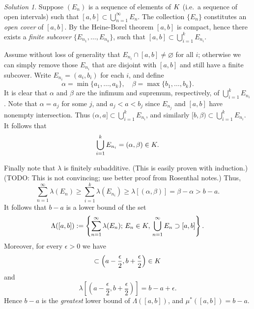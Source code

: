 \documentclass{report}
\let\sc\relax
\newcommand{\sc}[1]{\mathscr{#1}}
\theoremstyle{remark}
\newtheorem*{solution}{Solution}
\begin{document}
\begin{solution}
  Suppose $(E_n)$ is a sequence of elements of $\sc K$ (i.e.\ a sequence of open intervals) such that $[a,b] \subset \bigcup_{n=1}^\infty E_n$. The collection $\{E_n\}$ constitutes an \emph{open cover} of $[a,b]$. By the Heine-Borel theorem $[a,b]$ is compact, hence there exists a \emph{finite subcover} $\{E_{n_1}, \dots, E_{n_k}\}$, such that $[a,b] \subset \bigcup_{i=1}^k E_{n_i}$.

  Assume without loss of generality that $E_{n_i} \cap [a,b] \ne \varnothing$ for all $i$; otherwise we can simply remove those $E_{n_i}$ that are disjoint with $[a,b]$ and still have a finite subcover. Write $E_{n_i} = (a_i, b_i)$ for each $i$, and define
  \begin{equation*}
    \alpha = \min\{a_1, \dots, a_k\}, \quad \beta = \max\{b_1, \dots, b_k\}.
  \end{equation*}
  It is clear that $\alpha$ and $\beta$ are the infimum and supremum, respectively, of $\bigcup_{i=1}^k E_{n_i}$. Note that $\alpha = a_j$ for some $j$, and $a_j < a < b_j$ since $E_{n_j}$ and $[a,b]$ have nonempty intersection. Thus $(\alpha, a] \subset \bigcup_{i=1}^k E_{n_i}$, and similarly $[b, \beta) \subset \bigcup_{i=1}^k E_{n_i}$. It follows that
  \begin{equation*}
    \bigcup_{i=1}^k E_{n_i} = (\alpha, \beta) \in \sc K.
  \end{equation*}

  Finally note that $\lambda$ is finitely subadditive. (This is easily proven with induction.) (TODO: This is not convincing; use better proof from Rosenthal notes.) Thus,
  \begin{equation*}
    \sum_{n=1}^\infty \lambda(E_n) \ge \sum_{i=1}^k \lambda(E_{n_i}) \ge \lambda\left[ (\alpha, \beta) \right] = \beta - \alpha > b - a.
  \end{equation*}
  It follows that $b - a$ is a lower bound of the set
  \begin{equation*}
    \Lambda([a,b]) := \left\{ \sum_{n=1}^\infty \lambda(E_n); \, E_n \in \sc K, \, \bigcup_{n=1}^\infty E_n \supset [a,b] \right\}.
  \end{equation*}
  Moreover, for every $\epsilon > 0$ we have
  \begin{equation*}
    [a,b] \subset \left( a - \frac{\epsilon}{2}, b + \frac{\epsilon}{2} \right) \in \sc K
  \end{equation*}
  and
  \begin{equation*}
    \lambda \left[ \left( a - \frac{\epsilon}{2}, b + \frac{\epsilon}{2} \right) \right] = b - a + \epsilon.
  \end{equation*}
  Hence $b - a$ is the \emph{greatest} lower bound of $\Lambda([a,b])$, and $\mu^*([a,b]) = b - a$.
\end{solution}
\end{document}
